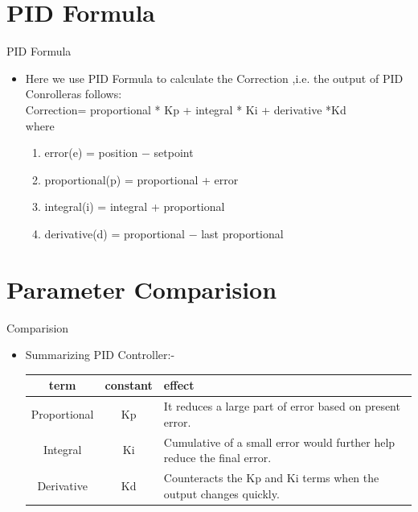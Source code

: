 \documentclass[10pt, a4paper]{beamer}
\begin{document}
	
		\section{PID Formula}
		\begin{frame}{PID Formula}
			\begin{itemize}
				\item Here we use PID Formula to calculate the Correction ,i.e. the output of PID Conrolleras follows: \\
					  Correction= proportional * Kp + integral * Ki + derivative *Kd	\\
					\text where  
					 \begin{enumerate}
					  \item error(e) = position $-$ setpoint \\
					  \item proportional(p) = proportional + error \\
					  \item integral(i) = integral + proportional	\\ 
					  \item derivative(d) = proportional $-$ last proportional	\\
					 \end{enumerate} 
			\end{itemize}
		\end{frame}
	
	\section{Parameter Comparision }
		\begin{frame}{Comparision}
			\begin{itemize}
				\item Summarizing PID Controller:-
				\begin{table}
				\begin{tabular}{||c| c| p{5 cm}||}
					\hline
					\textbf{term} & \textbf{constant} & \textbf{effect}\\
					\hline
					Proportional & Kp & It reduces a large part of error based on present error.
					 \\ \hline
					Integral & Ki & Cumulative of a small error would further help reduce the final error.
					 \\ \hline
					Derivative & Kd & Counteracts the Kp and Ki terms when the output changes quickly. \\
				\hline
				\end{tabular}
				\end{table}
			\end{itemize}
		\end{frame}
		
\end{document}
